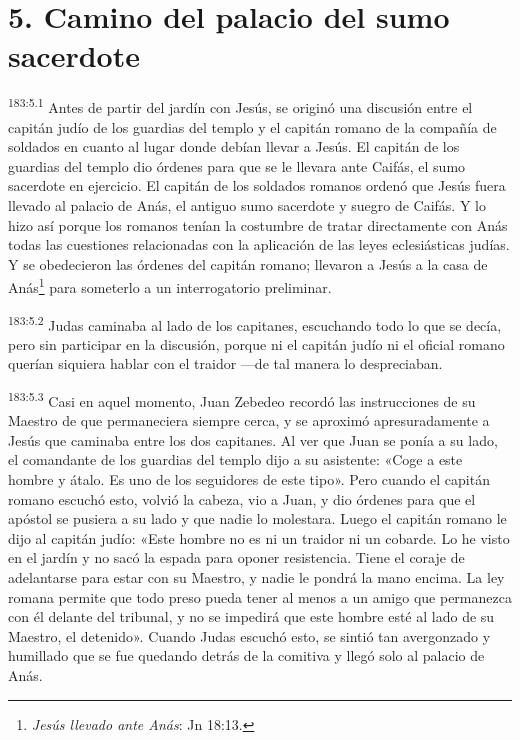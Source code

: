 \section*{5. Camino del palacio del sumo sacerdote}
\par
\textsuperscript{183:5.1} Antes de partir del jardín con Jesús, se originó una discusión entre el capitán judío de los guardias del templo y el capitán romano de la compañía de soldados en cuanto al lugar donde debían llevar a Jesús. El capitán de los guardias del templo dio órdenes para que se le llevara ante Caifás, el sumo sacerdote en ejercicio. El capitán de los soldados romanos ordenó que Jesús fuera llevado al palacio de Anás, el antiguo sumo sacerdote y suegro de Caifás. Y lo hizo así porque los romanos tenían la costumbre de tratar directamente con Anás todas las cuestiones relacionadas con la aplicación de las leyes eclesiásticas judías. Y se obedecieron las órdenes del capitán romano; llevaron a Jesús a la casa de Anás\footnote{\textit{Jesús llevado ante Anás}: Jn 18:13.} para someterlo a un interrogatorio preliminar.

\par
\textsuperscript{183:5.2} Judas caminaba al lado de los capitanes, escuchando todo lo que se decía, pero sin participar en la discusión, porque ni el capitán judío ni el oficial romano querían siquiera hablar con el traidor ---de tal manera lo despreciaban.

\par
\textsuperscript{183:5.3} Casi en aquel momento, Juan Zebedeo recordó las instrucciones de su Maestro de que permaneciera siempre cerca, y se aproximó apresuradamente a Jesús que caminaba entre los dos capitanes. Al ver que Juan se ponía a su lado, el comandante de los guardias del templo dijo a su asistente: «Coge a este hombre y átalo. Es uno de los seguidores de este tipo». Pero cuando el capitán romano escuchó esto, volvió la cabeza, vio a Juan, y dio órdenes para que el apóstol se pusiera a su lado y que nadie lo molestara. Luego el capitán romano le dijo al capitán judío: «Este hombre no es ni un traidor ni un cobarde. Lo he visto en el jardín y no sacó la espada para oponer resistencia. Tiene el coraje de adelantarse para estar con su Maestro, y nadie le pondrá la mano encima. La ley romana permite que todo preso pueda tener al menos a un amigo que permanezca con él delante del tribunal, y no se impedirá que este hombre esté al lado de su Maestro, el detenido». Cuando Judas escuchó esto, se sintió tan avergonzado y humillado que se fue quedando detrás de la comitiva y llegó solo al palacio de Anás.

